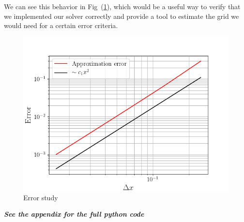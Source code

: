 \begin{mdframed}[style=MyFrame]
    We can see this behavior in Fig~(\ref{fig:temp-error}), which would
    be a useful way to verify that we implemented our solver correctly and
    provide a tool to estimate the grid we would need for a certain error
    criteria. 
    \begin{figure}[H]
        \includegraphics[height=0.35\textheight]{../media/error-profile.png}
        \caption{Error study}
        \label{fig:temp-error}
    \end{figure}
    \emph{\textbf{See the appendix for the full python code}}
\end{mdframed}

